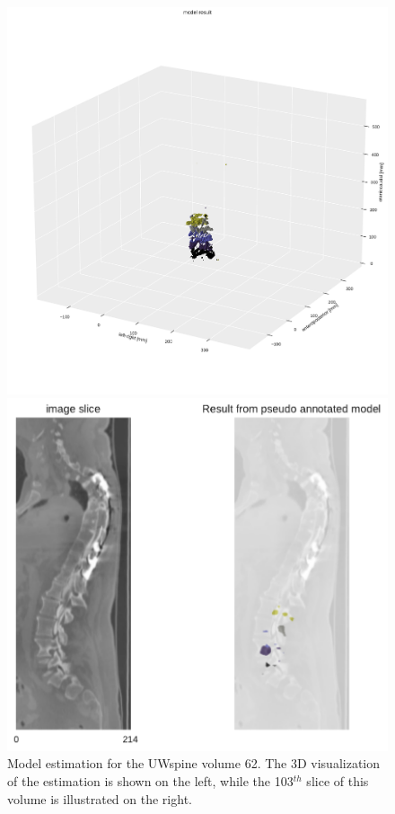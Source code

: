 \begin{figure}
    \centering
    \begin{minipage}{.49\textwidth}
        \includegraphics[width=.99\textwidth]{images/UW_result.pdf}
    \end{minipage}%
    \begin{minipage}{.49\textwidth}
        \includegraphics[width=.99\textwidth]{images/fullvsPseudo_UW_062_103.pdf}
    \end{minipage} 
    \caption{Model estimation for the UWspine volume 62. The 3D visualization of the estimation is shown on the left, while the 103$^{th}$ slice of this volume is illustrated on the right.
    \protect
    }
\end{figure}